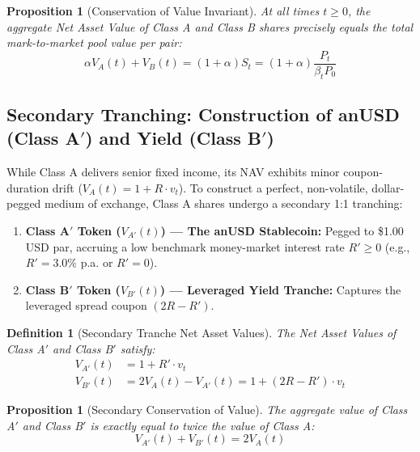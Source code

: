 \documentclass[11pt,a4paper]{article}
\newtheorem{proposition}[theorem]{Proposition}
\newtheorem{definition}{Definition}
\begin{document}
\begin{proposition}[Conservation of Value Invariant]
At all times $t \ge 0$, the aggregate Net Asset Value of Class A and Class B shares precisely equals the total mark-to-market pool value per pair:
\begin{equation}
    \alpha V_A(t) + V_B(t) = (1 + \alpha) S_t = (1 + \alpha) \frac{P_t}{\beta_t P_0}
\end{equation}
\end{proposition}

\subsection{Secondary Tranching: Construction of anUSD (Class A$'$) and Yield (Class B$'$)}
While Class A delivers senior fixed income, its NAV exhibits minor coupon-duration drift ($V_A(t) = 1 + R \cdot v_t$). To construct a perfect, non-volatile, dollar-pegged medium of exchange, Class A shares undergo a secondary 1:1 tranching:
\begin{enumerate}
    \item \textbf{Class A$'$ Token ($V_{A'}(t)$) --- The anUSD Stablecoin:} Pegged to \$1.00 USD par, accruing a low benchmark money-market interest rate $R' \ge 0$ (e.g., $R' = 3.0\%$ p.a. or $R' = 0$).
    \item \textbf{Class B$'$ Token ($V_{B'}(t)$) --- Leveraged Yield Tranche:} Captures the leveraged spread coupon $(2R - R')$.
\end{enumerate}

\begin{definition}[Secondary Tranche Net Asset Values]
The Net Asset Values of Class A$'$ and Class B$'$ satisfy:
\begin{align}
    V_{A'}(t) &= 1 + R' \cdot v_t \label{eq:vaprime_def} \\
    V_{B'}(t) &= 2 V_A(t) - V_{A'}(t) = 1 + (2R - R') \cdot v_t \label{eq:vbprime_def}
\end{align}
\end{definition}

\begin{proposition}[Secondary Conservation of Value]
The aggregate value of Class A$'$ and Class B$'$ is exactly equal to twice the value of Class A:
\begin{equation}
    V_{A'}(t) + V_{B'}(t) = 2 V_A(t)
\end{equation}
\end{proposition}
\end{document}
